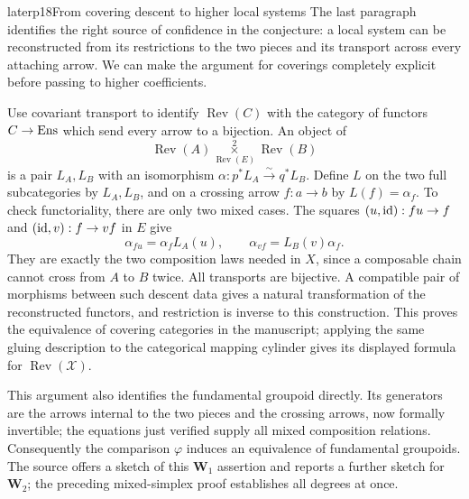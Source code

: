 \begin{dcomment}{later}{p18}{From covering descent to higher local systems}
The last paragraph identifies the right source of confidence in the conjecture: a local system can be reconstructed from its restrictions to the two pieces and its transport across every attaching arrow. We can make the argument for coverings completely explicit before passing to higher coefficients.

Use covariant transport to identify $\operatorname{Rev}(C)$ with the category of functors $C\to\mathrm{Ens}$ which send every arrow to a bijection. An object of
\[
 \operatorname{Rev}(A)
 \mathbin{\mathop{\times}\limits^{2}_{\operatorname{Rev}(E)}}
 \operatorname{Rev}(B)
\]
is a pair $L_A,L_B$ with an isomorphism $\alpha:p^*L_A\xrightarrow{\sim}q^*L_B$. Define $L$ on the two full subcategories by $L_A,L_B$, and on a crossing arrow $f:a\to b$ by $L(f)=\alpha_f$. To check functoriality, there are only two mixed cases. The squares $(u,\mathrm{id}):fu\to f$ and $(\mathrm{id},v):f\to vf$ in $E$ give
\[
 \alpha_{fu}=\alpha_f L_A(u),\qquad
 \alpha_{vf}=L_B(v)\alpha_f.
\]
They are exactly the two composition laws needed in $X$, since a composable chain cannot cross from $A$ to $B$ twice. All transports are bijective. A compatible pair of morphisms between such descent data gives a natural transformation of the reconstructed functors, and restriction is inverse to this construction. This proves the equivalence of covering categories in the manuscript; applying the same gluing description to the categorical mapping cylinder gives its displayed formula for $\operatorname{Rev}(\mathcal X)$.

This argument also identifies the fundamental groupoid directly. Its generators are the arrows internal to the two pieces and the crossing arrows, now formally invertible; the equations just verified supply all mixed composition relations. Consequently the comparison $\varphi$ induces an equivalence of fundamental groupoids. The source offers a sketch of this $\mathbf W_1$ assertion and reports a further sketch for $\mathbf W_2$; the preceding mixed-simplex proof establishes all degrees at once.


\end{dcomment}
